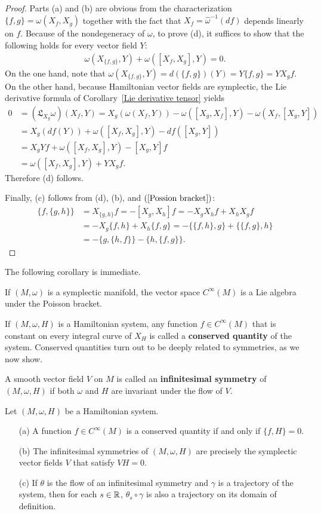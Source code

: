 \begin{proof}
Parts (a) and (b) are obvious from the characterization $\{f,g\}=\omega(X_f,X_g)$ together with the fact that $X_f=\widehat{\omega}^{-1}(df)$ depends linearly on $f$. Because of the nondegeneracy of $\omega$, to prove (d), it suffices to show that the following holds for every vector field $Y$:
\begin{align}\label{Possion bracket prop-1}
\omega(X_{\{f,g\}},Y)+\omega([X_f,X_g],Y)=0.
\end{align}
On the one hand, note that $\omega(X_{\{f,g\}},Y)=d(\{f,g\})(Y)=Y\{f,g\}=YX_gf$. On the other hand, because Hamiltonian vector fields are symplectic, the Lie derivative formula of Corollary~\ref{Lie derivative tensor} yields
\begin{align*}
0&=(\mathfrak{L}_{X_g}\omega)(X_f,Y)=X_g(\omega(X_f,Y))-\omega([X_g,X_f],Y)-\omega(X_f,[X_g,Y])\\
&=X_g(df(Y))+\omega([X_f,X_g],Y)-df([X_g,Y])\\
&=X_gYf+\omega([X_f,X_g],Y)-[X_g,Y]f\\
&=\omega([X_f,X_g],Y)+YX_gf.
\end{align*}
Therefore (d) follows.\par
Finally, (c) follows from (d), (b), and $(\ref{Possion bracket})$:
\begin{align*}
\{f,\{g,h\}\}&=X_{\{g,h\}}f=-[X_g,X_h]f=-X_gX_hf+X_hX_gf\\
&=-X_g\{f,h\}+X_h\{f,g\}=-\{\{f,h\},g\}+\{\{f,g\},h\}\\
&=-\{g,\{h,f\}\}-\{h,\{f,g\}\}.
\end{align*}
\end{proof}
The following corollary is immediate.
\begin{corollary}
If $(M,\omega)$ is a symplectic manifold, the vector space $C^\infty(M)$ is a Lie algebra under the Poisson bracket.
\end{corollary}
If $(M,\omega,H)$ is a Hamiltonian system, any function $f\in C^\infty(M)$ that is constant on every integral curve of $X_H$ is called a \textbf{conserved quantity} of the system. Conserved quantities turn out to be deeply related to symmetries, as we now show.\par
A smooth vector field $V$ on $M$ is called an \textbf{infinitesimal symmetry} of $(M,\omega,H)$ if both $\omega$ and $H$ are invariant under the flow of $V$.
\begin{proposition}
Let $(M,\omega,H)$ be a Hamiltonian system.
\begin{itemize}
\item[(a)] A function $f\in C^\infty(M)$ is a conserved quantity if and only if $\{f,H\}=0$.
\item[(b)] The infinitesimal symmetries of $(M,\omega,H)$ are precisely the symplectic vector fields $V$ that satisfy $VH=0$.
\item[(c)] If $\theta$ is the flow of an infinitesimal symmetry and $\gamma$ is a trajectory of the system, then for each $s\in\mathbb{R}$, $\theta_s\circ\gamma$ is also a trajectory on its domain of definition.
\end{itemize}
\end{proposition}
